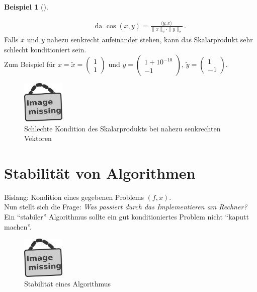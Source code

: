 \documentclass[ngerman,fontsize=11pt, paper=a4, parskip=half, titlepage=true, toc=bib]{scrbook}
\theoremstyle{definition}
\newtheorem{Bsp}[Def]{Beispiel}
\theoremstyle{plain}
\newcommand{\sectione}[1]{ \setcounter{equation}{0}\section{#1}}
\newenvironment{Bspe}[1][]{ %
	\begin{Bsp}[#1]
	}
	{
	\end{Bsp}
	\addtocounter{subsection}{1}
}
\begin{document}
\begin{Bspe}
\begin{enumerate}[a)]
\begin{align*}
				&&&				\text{	da  }\cos(x,y) = \frac{\langle y,x \rangle}{\|x\|_2 \cdot \|y\|_2} \, . 
				\end{align*}
				Falls $x$ und $y$ nahezu senkrecht aufeinander stehen, kann das Skalarprodukt sehr schlecht konditioniert sein. \\
				Zum Beispiel für $x=\widetilde{x} = \begin{pmatrix} 1 \\1 \end{pmatrix}$
				und $y=\begin{pmatrix} 1+10^{-10} \\-1 \end{pmatrix},
				\, \widetilde{y}=\begin{pmatrix} 1 \\-1 \end{pmatrix}$. \\
				\begin{figure}
					\parbox{\linewidth}{
						\centering
						\includegraphics[width=2cm]{images/image_missing.jpg}
						}
						\caption{Schlechte Kondition des Skalarprodukts bei nahezu senkrechten Vektoren}
				\end{figure}
	\end{enumerate}	
\end{Bspe}

  \sectione{Stabilität von Algorithmen}
  Bislang: Kondition eines gegebenen Problems $(f,x)$. \\
  Nun stellt sich die Frage: \textit{Was passiert durch das Implementieren am Rechner? }\\
  Ein \enquote{stabiler} Algorithmus sollte ein gut konditioniertes Problem nicht \enquote{kaputt machen}.\\

  \begin{figure}
    \parbox{\linewidth}{
      \centering
      \includegraphics[width=2cm]{images/image_missing.jpg}
    }
    \caption{Stabilität eines Algorithmus}
  \end{figure}
\end{document}
